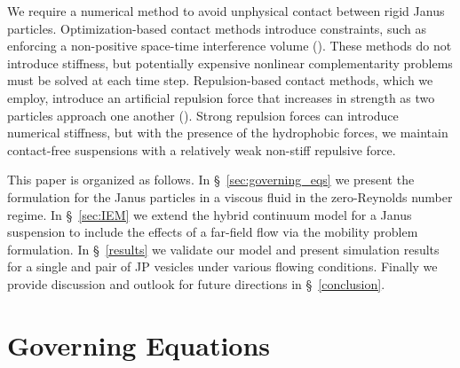 \documentclass[lineno]{jfm}
\begin{document}
We require a numerical method to avoid unphysical contact between rigid
Janus particles. Optimization-based contact methods introduce
constraints, such as enforcing a non-positive space-time interference
volume (\cite{lu-rah-zor2017, Lukas19, yan-cor-mal-vee-she2020}). These
methods do not introduce stiffness, but potentially expensive nonlinear
complementarity problems must be solved at each time step.
Repulsion-based contact methods, which we employ, introduce an
artificial repulsion force that increases in strength as two particles
approach one another (\cite{glo-pan-hes-jos-per2001, fen-mic2004,
kab-qua-bir2018}). Strong repulsion forces can introduce numerical
stiffness, but with the presence of the hydrophobic forces, we maintain
contact-free suspensions with a relatively weak non-stiff repulsive
force.

This paper is organized as follows. In \S~\ref{sec:governing_eqs} we
present the formulation for the Janus particles in a viscous fluid in
the zero-Reynolds number regime. In \S~\ref{sec:IEM} we extend the
hybrid continuum model for a Janus suspension to include the effects of
a far-field flow via the mobility problem formulation. In
\S~\ref{results} we validate our model and present simulation results
for a single and pair of JP vesicles under various flowing conditions.
Finally we provide discussion and outlook for future directions in
\S~\ref{conclusion}.

\section{Governing Equations\label{sec:governing_eqs}}
\end{document}
